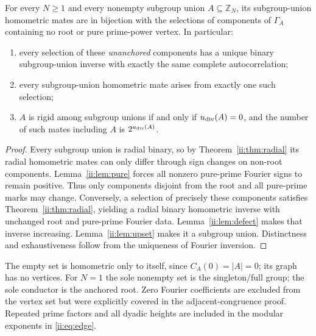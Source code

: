 \begin{theorem}\label{ii:thm:subgroups}
For every $N\ge1$ and every nonempty subgroup union $A\subseteq\mathbb Z_N$, its subgroup-union homometric mates are in bijection with the selections of components of $\Gamma_A$ containing no root or pure prime-power vertex.  In particular:
\begin{enumerate}[label=(\alph*),nosep]
\item every selection of these \emph{unanchored} components has a unique binary subgroup-union inverse with exactly the same complete autocorrelation;
\item every subgroup-union homometric mate arises from exactly one such selection;
\item $A$ is rigid among subgroup unions if and only if $u_{\rm div}(A)=0$, and the number of such mates including $A$ is $2^{u_{\rm div}(A)}$.
\end{enumerate}
\end{theorem}
\begin{proof}
Every subgroup union is radial binary, so by Theorem~\ref{ii:thm:radial} its radial homometric mates can only differ through sign changes on non-root components.  Lemma~\ref{ii:lem:pure} forces all nonzero pure-prime Fourier signs to remain positive.  Thus only components disjoint from the root and all pure-prime marks may change.  Conversely, a selection of precisely these components satisfies Theorem~\ref{ii:thm:radial}, yielding a radial binary homometric inverse with unchanged root and pure-prime Fourier data.  Lemma~\ref{ii:lem:defect} makes that inverse increasing.  Lemma~\ref{ii:lem:upset} makes it a subgroup union.  Distinctness and exhaustiveness follow from the uniqueness of Fourier inversion.\qedhere
\end{proof}

\begin{remark}\label{ii:rem:degenerate}
The empty set is homometric only to itself, since $C_A(0)=|A|=0$; its graph has no vertices.  For $N=1$ the sole nonempty set is the singleton/full group; the sole conductor is the anchored root.  Zero Fourier coefficients are excluded from the vertex set but were explicitly covered in the adjacent-congruence proof.  Repeated prime factors and all dyadic heights are included in the modular exponents in \eqref{ii:eq:edge}.
\end{remark}

